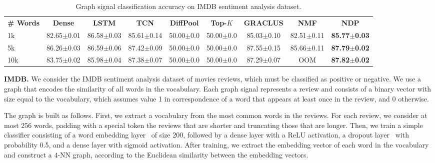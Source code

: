 \documentclass[journal]{IEEEtran}
\begin{document}
\begin{table*}
\centering
\setlength\tabcolsep{1em} \small
\bgroup
\def\arraystretch{1.25} \caption{Graph signal classification accuracy on IMDB sentiment analysis dataset.}
\begin{tabular}{lcccccccc}
\cmidrule[1.5pt]{1-9}
\textbf{\# Words} & \textbf{Dense} & \textbf{LSTM} & \textbf{TCN} & \textbf{DiffPool} & \textbf{Top-$K$} & \textbf{GRACLUS} & \textbf{NMF} & \textbf{NDP} \\
\cmidrule[.5pt]{1-9}
1k  & 82.65{\tiny$\pm$0.01} & 86.58{\tiny$\pm$0.03} & 85.61{\tiny$\pm$0.14} & 50.00{\tiny$\pm$0.0} & 50.00{\tiny$\pm$0.0} & 85.03{\tiny$\pm$0.10} & 82.51{\tiny$\pm$0.11} & \textbf{85.77{\tiny$\pm$0.03}} \\ 5k  & 86.26{\tiny$\pm$0.03} & 86.59{\tiny$\pm$0.06} & 87.42{\tiny$\pm$0.09} & 50.00{\tiny$\pm$0.0} & 50.00{\tiny$\pm$0.0} & 87.55{\tiny$\pm$0.15} & 85.66{\tiny$\pm$0.11} & \textbf{87.79{\tiny$\pm$0.02}}\\ 10k & 83.75{\tiny$\pm$0.02} & 85.98{\tiny$\pm$0.04} & 87.38{\tiny$\pm$0.07} & 50.00{\tiny$\pm$0.0} & 50.00{\tiny$\pm$0.0} & 87.29{\tiny$\pm$0.07} & OOM & \textbf{87.82{\tiny$\pm$0.02}} \\ \cmidrule[1.5pt]{1-9}
\end{tabular}
\label{tab:imdb_res}
\egroup
\end{table*}


\textbf{IMDB.} 
We consider the IMDB sentiment analysis dataset of movies reviews, which must be classified as positive or negative.
We use a graph that encodes the similarity of all words in the vocabulary. 
Each graph signal represents a review and consists of a binary vector with size equal to the vocabulary, which assumes value 1 in correspondence of a word that appears at least once in the review, and 0 otherwise.

The graph is built as follows.
First, we extract a vocabulary from the most common words in the reviews.
For each review, we consider at most 256 words, padding with a special token the reviews that are shorter and truncating those that are longer.
Then, we train a simple classifier consisting of a word embedding layer~\cite{mikolov2013distributed} of size 200, followed by a dense layer with a ReLU activation, a dropout layer~\cite{srivastava2014dropout} with probability 0.5, and a dense layer with sigmoid activation. 
After training, we extract the embedding vector of each word in the vocabulary and construct a $4$-NN graph, according to the Euclidean similarity between the embedding vectors.
\end{document}
